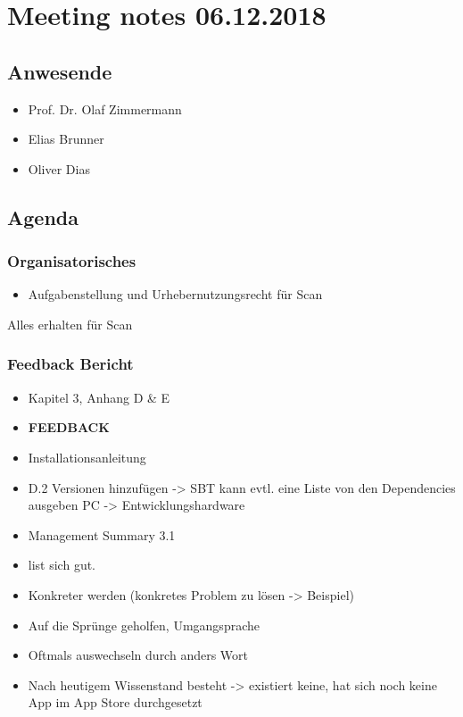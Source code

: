 \hypertarget{meeting-notes-06122018}{%
\section*{Meeting notes 06.12.2018}\label{meeting-notes-06122018}}

\hypertarget{anwesende}{%
\subsection*{Anwesende}\label{anwesende}}

\begin{itemize}

\item
  Prof. Dr. Olaf Zimmermann
\item
  Elias Brunner
\item
  Oliver Dias
\end{itemize}

\hypertarget{agenda}{%
\subsection*{Agenda}\label{agenda}}

\hypertarget{organisatorisches}{%
\subsubsection*{Organisatorisches}\label{organisatorisches}}

\begin{itemize}

\item
  Aufgabenstellung und Urhebernutzungsrecht für Scan
\end{itemize}

Alles erhalten für Scan

\hypertarget{feedback-bericht}{%
\subsubsection*{Feedback Bericht}\label{feedback-bericht}}

\begin{itemize}
\item
  Kapitel 3, Anhang D \& E 
  \item \textbf{FEEDBACK}
\item
  Installationsanleitung 
  \item D.2 Versionen hinzufügen -\textgreater{} SBT
  kann evtl. eine Liste von den Dependencies ausgeben PC -\textgreater{}
  Entwicklungshardware
\item
  Management Summary 3.1
\item
  list sich gut.
\item
  Konkreter werden (konkretes Problem zu lösen -\textgreater{} Beispiel)
\item
  Auf die Sprünge geholfen, Umgangsprache
\item
  Oftmals auswechseln durch anders Wort
\item
  Nach heutigem Wissenstand besteht -\textgreater{} existiert keine, hat
  sich noch keine App im App Store durchgesetzt
\end{itemize}

